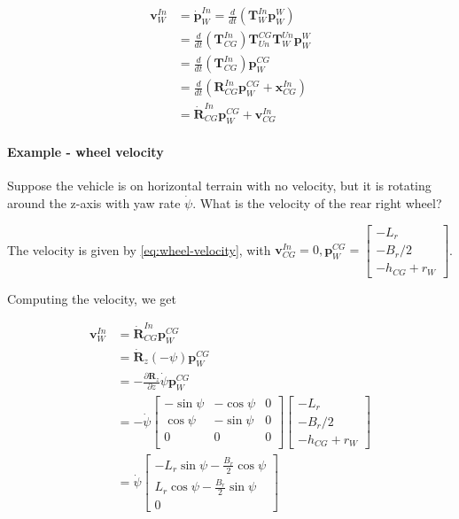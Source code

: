 \begin{align}
  \mathbf{v}_W^{In} &= \dot{\mathbf{p}}_W^{In} = \frac{d}{dt}\left( \mathbf{T}_W^{In} \mathbf{p}_W^{W} \right) \\
    &= \frac{d}{dt}\left( \mathbf{T}_{CG}^{In}\right)\mathbf{T}_{Un}^{CG} \mathbf{T}_{W}^{Un} \mathbf{p}_W^{W}  \\
    &= \frac{d}{dt}\left( \mathbf{T}_{CG}^{In}\right) \mathbf{p}_W^{CG} \\
    &= \frac{d}{dt} \left( \mathbf{R}_{CG}^{In} \mathbf{p}_W^{CG}  + \mathbf{x}_{CG}^{In} \right) \\
    &= \dot{\mathbf{R}}_{CG}^{In} \mathbf{p}_W^{CG}  + \mathbf{v}_{CG}^{In} \label{eq:wheel-velocity}
\end{align}


\paragraph{Example - wheel velocity}

Suppose the vehicle is on horizontal terrain with no velocity, but it is rotating around the z-axis with yaw rate $\dot{\psi}$. What is the velocity of the rear right wheel? 

The velocity is given by \cref{eq:wheel-velocity}, with $\mathbf{v}_{CG}^{In} = 0, \mathbf{p}_W^{CG} = \begin{bmatrix} -L_r \\ -B_r/2 \\ -h_{CG} + r_W \end{bmatrix}$. 

Computing the velocity, we get

\begin{align}
\mathbf{v}_W^{In} &= \dot{\mathbf{R}}_{CG}^{In} \mathbf{p}_W^{CG} \\ 
  &= \dot{\mathbf{R}}_z(-\psi) \mathbf{p}_W^{CG} \\
  &= -\frac{\partial \mathbf{R}_z}{\partial z} \dot{\psi} \mathbf{p}_W^{CG} \\
  &= -\dot{\psi} 
    \begin{bmatrix}
      -\sin{\psi} & -\cos{\psi} & 0 \\
      \cos{\psi} &  -\sin{\psi} &  0 \\
      0 & 0 & 0 \\
    \end{bmatrix} 
    \begin{bmatrix}
      -L_r \\
      -B_r/2 \\
      -h_{CG} + r_W 
    \end{bmatrix} \\
  &= \dot{\psi}
    \begin{bmatrix}
      -L_r \sin{\psi} - \frac{B_r}{2}\cos{\psi} \\
      L_r \cos{\psi} - \frac{B_r}{2}\sin{\psi} \\
      0
    \end{bmatrix} \\
\end{align} 







